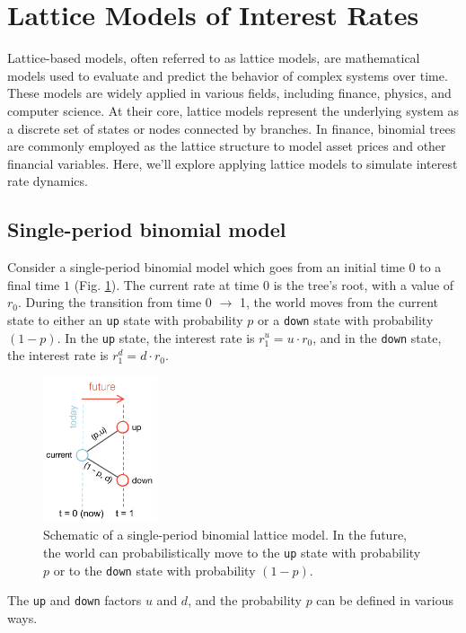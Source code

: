 \documentclass[11pt]{article}
\theoremstyle{definition}
\begin{document}
\clearpage

\section{Lattice Models of Interest Rates}
Lattice-based models, often referred to as lattice models, are mathematical models used to evaluate and predict the behavior of complex systems over time. 
These models are widely applied in various fields, including finance, physics, and computer science. 
At their core, lattice models represent the underlying system as a discrete set of states or nodes connected by branches. In finance, binomial trees are commonly employed as the lattice structure to model asset prices and other financial variables. Here, we'll explore applying lattice models to simulate interest rate dynamics. 

\subsection{Single-period binomial model}
Consider a single-period binomial model which goes from an initial time $0$ to a final time $1$ (Fig. \ref{fig:example-oneste-binomial-lattice-schematic}).
The current rate at time $0$ is the tree's root, with a value of $r_{0}$.
During the transition from time 0 $\rightarrow$ 1, the world moves 
from the current state to either an \texttt{up} state with probability $p$ or a \texttt{down} state with probability $(1-p)$.
In the \texttt{up} state, the interest rate is $r_{1}^{u} = u\cdot{r_{0}}$, 
and in the \texttt{down} state, the interest rate is $r_{1}^{d} = d\cdot{r_{0}}$.
\begin{figure}[h]
    \centering
    \includegraphics[width=0.30\textwidth]{./figs/Fig-OneStep-Binomial-Lattice-Schematic.pdf}
    \caption{Schematic of a single-period binomial lattice model. 
	In the future, the world can probabilistically move to the \texttt{up} state with probability $p$ or to the \texttt{down} state with probability $(1-p)$. 
	}\label{fig:example-oneste-binomial-lattice-schematic}
\end{figure}
The \texttt{up} and \texttt{down} factors $u$ and $d$, and the probability $p$ can be defined in various ways.  
\end{document}
